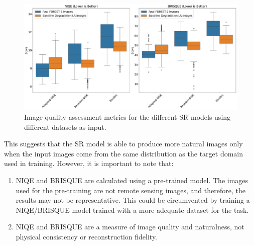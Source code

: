    \begin{figure}[H]
        \centering
        \includegraphics[scale=0.25]{Includes/5-target-iqa-results.pdf}
        \caption{Image quality assessment metrics for the different SR models using different datasets as input. }
        \label{fig:5-target-iqa-results}
    \end{figure}

    
    This suggests that the SR model is able to produce more natural images only when the input images come from the same distribution as the target domain used in training. However, it is important to note that: 

    


    \begin{enumerate}
        \item NIQE and BRISQUE are calculated using a pre-trained model. The images used for the pre-training are not remote sensing images, and therefore, the results may not be representative. This could be circumvented by training a NIQE/BRISQUE model trained with a more adequate dataset for the task.
        \item NIQE and BRISQUE are a measure of image quality and naturalness, not physical consistency or reconstruction fidelity.
    \end{enumerate}
        
\newpage
    